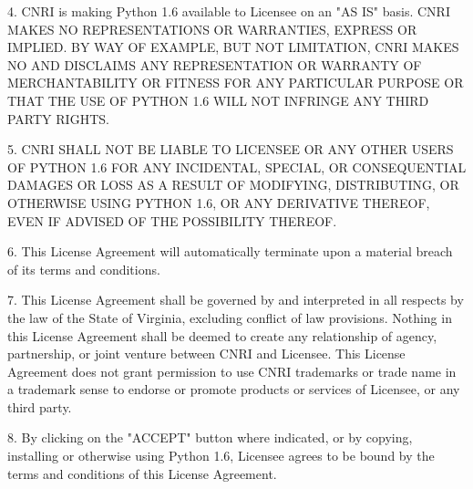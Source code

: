 4. CNRI is making Python 1.6 available to Licensee on an "AS IS"
basis.  CNRI MAKES NO REPRESENTATIONS OR WARRANTIES, EXPRESS OR
IMPLIED.  BY WAY OF EXAMPLE, BUT NOT LIMITATION, CNRI MAKES NO AND
DISCLAIMS ANY REPRESENTATION OR WARRANTY OF MERCHANTABILITY OR FITNESS
FOR ANY PARTICULAR PURPOSE OR THAT THE USE OF PYTHON 1.6 WILL NOT
INFRINGE ANY THIRD PARTY RIGHTS.

5. CNRI SHALL NOT BE LIABLE TO LICENSEE OR ANY OTHER USERS OF PYTHON
1.6 FOR ANY INCIDENTAL, SPECIAL, OR CONSEQUENTIAL DAMAGES OR LOSS AS A
RESULT OF MODIFYING, DISTRIBUTING, OR OTHERWISE USING PYTHON 1.6, OR
ANY DERIVATIVE THEREOF, EVEN IF ADVISED OF THE POSSIBILITY THEREOF.

6. This License Agreement will automatically terminate upon a material
breach of its terms and conditions.

7. This License Agreement shall be governed by and interpreted in all
respects by the law of the State of Virginia, excluding conflict of
law provisions.  Nothing in this License Agreement shall be deemed to
create any relationship of agency, partnership, or joint venture
between CNRI and Licensee.  This License Agreement does not grant
permission to use CNRI trademarks or trade name in a trademark sense
to endorse or promote products or services of Licensee, or any third
party.

8. By clicking on the "ACCEPT" button where indicated, or by copying,
installing or otherwise using Python 1.6, Licensee agrees to be bound
by the terms and conditions of this License Agreement.
